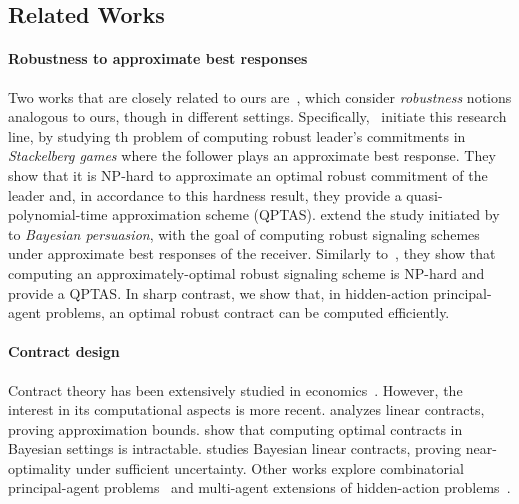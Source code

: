 \subsection{Related Works}
%
\paragraph{Robustness to approximate best responses} 
Two works that are closely related to ours are~\citep{gan2024robust,yang2024computational}, which consider \emph{robustness} notions analogous to ours, though in different settings.
%
Specifically,~\citet{gan2024robust} initiate this research line, by studying th problem of computing robust leader's commitments in \emph{Stackelberg games} where the follower plays an approximate best response.
%
%
They show that it is \textsf{NP}-hard to approximate an optimal robust commitment of the leader and, in accordance to this hardness result, they provide a quasi-polynomial-time approximation scheme (QPTAS).
%
\citet{yang2024computational} extend the study initiated by~\citet{gan2024robust} to \emph{Bayesian persuasion}, with the goal of computing robust signaling schemes under approximate best responses of the receiver.
%
Similarly to~\citet{gan2024robust}, they show that computing an approximately-optimal robust signaling scheme is \textsf{NP}-hard and provide a QPTAS.
%
In sharp contrast, we show that, in hidden-action principal-agent problems, an optimal robust contract can be computed efficiently.
%
\paragraph{Contract design} 
Contract theory has been extensively studied in economics~\cite{holmstrom1991multitask}. 
%
However, the interest in its computational aspects is more recent. 
%
\citep{dutting2019simple} analyzes linear contracts, proving approximation bounds. \citep{castiglioni2022bayesian,guruganesh2021contracts} show that computing optimal contracts in Bayesian settings is intractable. 
%
\citep{alon2023bayesian} studies Bayesian linear contracts, proving near-optimality under sufficient uncertainty. 
%
Other works explore combinatorial principal-agent problems~\citep{babaioff2006combinatorial,babaioff2009free} and multi-agent extensions of hidden-action problems~\citep{castiglioni2023multi,duetting2024multiagent}.


